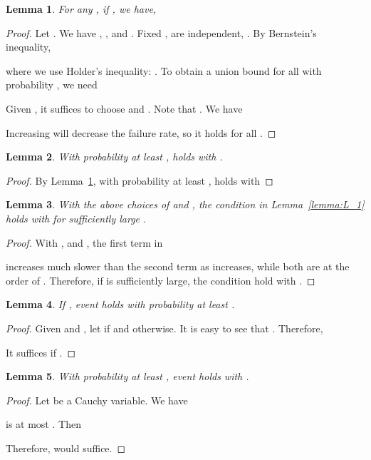 \documentclass[11pt]{article}
\newtheorem{lemma}{Lemma}
\begin{document}
\begin{lemma}
  \label{lemma:E_L}
  For any , if , we have,
  
\end{lemma}
\begin{proof}
  Let .
  We have , ,
  and .
  Fixed ,  are independent, .
  By Bernstein's inequality,
  
  where we use Holder's inequality: .
  To obtain a union bound for all  with probability , we need
  
  Given , it suffices to choose  and .
  Note that .
  We have
  
  Increasing  will decrease the failure rate, so it holds for all .
\end{proof}

\begin{lemma}
  With probability at least ,  holds with .
\end{lemma}
\begin{proof}
  By Lemma~\ref{lemma:E_L}, with probability at least , 
  holds with
  
\end{proof}

\begin{lemma}
  With the above choices of  and , the condition in
  Lemma~\ref{lemma:L_1} holds with  for sufficiently large
  .
\end{lemma}
\begin{proof}
  With , and , the first term in
  
  increases much slower than the second term as  increases, while both
  are at the order of .
  Therefore, if  is sufficiently large, the condition hold with .
\end{proof}

\begin{lemma}
  If , event  holds with probability at least
  .
\end{lemma}
\begin{proof}
  Given  and , let  if  and  otherwise.
  It is easy to see that .
  Therefore,
  
  It suffices if .
\end{proof}

\begin{lemma}
  With probability at least , event  holds with .
\end{lemma}
\begin{proof}
  Let  be a Cauchy variable. We have
  
   is at most . Then
  
  Therefore,  would suffice.
\end{proof}
\end{document}
